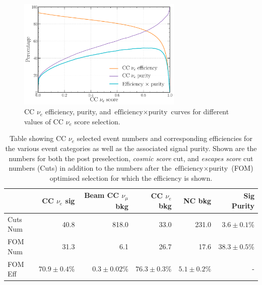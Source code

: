 \begin{figure} %
    \includegraphics[width=0.7\textwidth]{diagrams/7-results/final_nuel_eff_curves.pdf}
    \caption[CC $\nu_{e}$ efficiency, purity, and $\text{efficiency}\times\text{purity}$ curves]
    {CC $\nu_{e}$ efficiency, purity, and $\text{efficiency}\times\text{purity}$ curves for
        different values of CC $\nu_{e}$ score selection.}
    \label{fig:final_nuel_eff_curves}
\end{figure}

\begin{table}
    \begin{tabular}{lrrrrr}
                 & CC $\nu_{e}$ sig & Beam CC $\nu_{\mu}$ bkg & CC $\nu_{e}$ bkg & NC bkg        &
                 Sig Purity     \\
        \midrule
        Cuts Num & 40.8             & 818.0                   & 33.0             & 231.0         &
        $3.6\pm0.1\%$  \\
        FOM Num  & 31.3             & 6.1                     & 26.7             & 17.6          &
        $38.3\pm0.5\%$ \\
        \midrule
        FOM Eff  & $70.9\pm0.4\%$   & $0.3\pm0.02\%$          & $76.3\pm0.3\%$   & $5.1\pm0.2\%$ &
        -              \\
    \end{tabular}
    \caption[Table showing CC $\nu_{e}$ selected event numbers, efficiencies and signal purity]
    {Table showing CC $\nu_{e}$ selected event numbers and corresponding efficiencies for the
        various event categories as well as the associated signal purity. Shown are the numbers
        for both the post preselection, \emph{cosmic score} cut, and \emph{escapes score} cut
        numbers (Cuts) in addition to the numbers after the       
        $\text{efficiency}\times\text{purity}$ (FOM) optimised selection for which the efficiency
        is shown.}
    \label{tab:nuel_selection}
\end{table}

